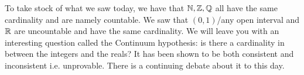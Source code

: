 To take stock of what we saw today, we have that $\mathbb{N}, \mathbb{Z}, \mathbb{Q}$ all have the same cardinality and are namely countable. We saw that $(0,1)$/any open interval and $\mathbb{R}$ are uncountable and have the same cardinality. We will leave you with an interesting question called the Continuum hypothesis: is there a cardinality in between the integers and the reals? It has been shown to be both consistent and inconsistent i.e. unprovable. There is a continuing debate about it to this day. 
